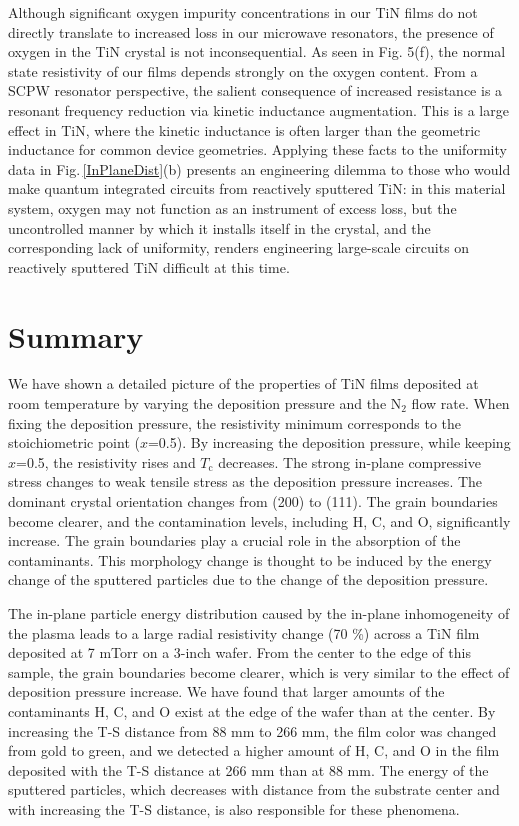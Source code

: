 Although significant oxygen impurity concentrations in our TiN films do not directly translate to increased loss in our microwave resonators, the presence of oxygen in the TiN crystal is not inconsequential.  As seen in Fig. 5(f), the normal state resistivity of our films depends strongly on the oxygen content.  From a SCPW resonator perspective, the salient consequence of increased resistance is a resonant frequency reduction via kinetic inductance augmentation.  This is a large effect in TiN, where the kinetic inductance is often larger than the geometric inductance for common device geometries.  Applying these facts to the uniformity data in Fig.\,\ref{InPlaneDist}(b)  presents an engineering dilemma to those who would make quantum integrated circuits from reactively sputtered TiN: in this material system, oxygen may not function as an instrument of excess loss, but the uncontrolled manner by which it installs itself in the crystal, and the corresponding lack of uniformity, renders engineering large-scale circuits on reactively sputtered TiN difficult at this time.								

\section{Summary}
We have shown a detailed picture of the properties of TiN films deposited at room temperature by varying the deposition pressure and the N$_{2}$ flow rate. When fixing the deposition pressure, the resistivity minimum corresponds to the stoichiometric point ($x$=0.5). By increasing the deposition pressure, while keeping $x$=0.5, the resistivity rises and $T_{\text{c}}$ decreases. The strong in-plane compressive stress changes to weak tensile stress as the deposition pressure increases. The dominant crystal orientation changes from (200) to (111). The grain boundaries become clearer, and the contamination levels, including H, C, and O, significantly increase. The grain boundaries play a crucial role in the absorption of the contaminants. This morphology change is thought to be induced by the energy change of the sputtered particles due to the change of the deposition pressure.

The in-plane particle energy distribution caused by the in-plane inhomogeneity of the plasma leads to a large radial resistivity change (70 \%) across a TiN film deposited at 7 mTorr on a 3-inch wafer. From the center to the edge of this sample, the grain boundaries become clearer, which is very similar to the effect of deposition pressure increase. We have found that larger amounts of the contaminants H, C, and O exist at the edge of the wafer than at the center. By increasing the T-S distance from 88 mm to 266 mm, the film color was changed from gold to green, and we detected a higher amount of H, C, and O in the film deposited with the T-S distance at 266 mm than at 88 mm. The energy of the sputtered particles, which decreases with distance from the substrate center and with increasing the T-S distance, is also responsible for these phenomena.

